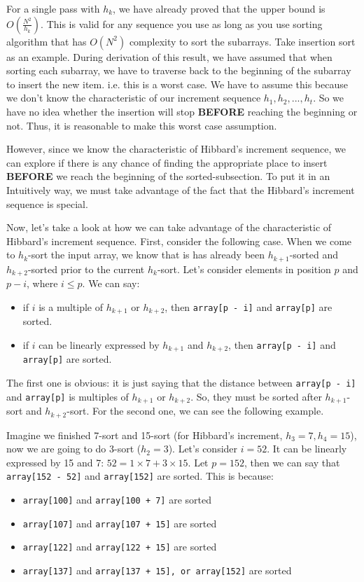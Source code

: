 \documentclass[12pt]{book}
\begin{document}
For a single pass with \(h_k\), we have already proved that the upper bound is \(O(\frac {N^2} {h_k})\). This is valid for any sequence you use as long as you use sorting algorithm that has \(O(N^2)\) complexity to sort the subarrays. Take insertion sort as an example. During derivation of this result, we have assumed that when sorting each subarray, we have to traverse back to the beginning of the subarray to insert the new item. i.e. this is a worst case. We have to assume this because we don't know the characteristic of our increment sequence \(h_1, h_2, ..., h_t\). So we have no idea whether the insertion will stop \textbf{BEFORE} reaching the beginning or not. Thus, it is reasonable to make this worst case assumption.

However, since we know the characteristic of Hibbard's increment sequence, we can explore if there is any chance of finding the appropriate place to insert \textbf{BEFORE} we reach the beginning of the sorted-subsection. To put it in an Intuitively way, we must take advantage of the fact that the Hibbard's increment sequence is special.

Now, let's take a look at how we can take advantage of the characteristic of Hibbard's increment sequence. First, consider the following case. When we come to \(h_k\)-sort the input array, we know that is has already been \(h_{k + 1}\)-sorted and \(h_{k + 2}\)-sorted prior to the current \(h_k\)-sort. Let's consider elements in position \(p\) and \(p - i\), where \(i \leq p\). We can say:
\begin{itemize}
\item if \(i\) is a multiple of \(h_{k + 1}\) or \(h_{k + 2}\), then \texttt{array[p - i]} and \texttt{array[p]} are sorted.
\item if \(i\) can be linearly expressed by \(h_{k + 1}\) and \(h_{k + 2}\), then \texttt{array[p - i]} and \texttt{array[p]} are sorted.
\end{itemize}

The first one is obvious: it is just saying that the distance between \texttt{array[p - i]} and \texttt{array[p]} is multiples of \(h_{k + 1}\) or \(h_{k + 2}\). So, they must be sorted after \(h_{k + 1}\)-sort and \(h_{k + 2}\)-sort. For the second one, we can see the following example.

Imagine we finished 7-sort and 15-sort (for Hibbard's increment, \(h_3 = 7, h_4 = 15\)), now we are going to do 3-sort (\(h_2 = 3\)). Let's consider \(i = 52\). It can be linearly expressed by 15 and 7: \(52 = 1 \times 7 + 3 \times 15\). Let \(p = 152\), then we can say that \texttt{array[152 - 52]} and \texttt{array[152]} are sorted. This is because:
\begin{itemize}
\item \texttt{array[100]} and \texttt{array[100 + 7]} are sorted
\item \texttt{array[107]} and \texttt{array[107 + 15]} are sorted
\item \texttt{array[122]} and \texttt{array[122 + 15]} are sorted
\item \texttt{array[137]} and \texttt{array[137 + 15], or array[152]} are sorted
\end{itemize}
\end{document}
